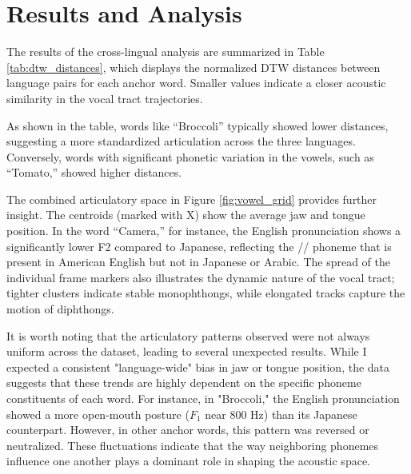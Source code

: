 \documentclass[11pt, letterpaper]{article}
\begin{document}

\section{Results and Analysis}
The results of the cross-lingual analysis are summarized in Table \ref{tab:dtw_distances}, which displays the normalized DTW distances between language pairs for each anchor word. Smaller values indicate a closer acoustic similarity in the vocal tract trajectories.

As shown in the table, words like ``Broccoli'' typically showed lower distances, suggesting a more standardized articulation across the three languages. 
Conversely, words with significant phonetic variation in the vowels, such as ``Tomato,'' showed higher distances.

The combined articulatory space in Figure \ref{fig:vowel_grid} provides further insight. 
The centroids (marked with X) show the average jaw and tongue position. 
In the word ``Camera,'' for instance, the English pronunciation shows a significantly lower F2 compared to Japanese, reflecting the /\textipa{\textturnr}/ phoneme that is present in American English but not in Japanese or Arabic.
The spread of the individual frame markers also illustrates the dynamic nature of the vocal tract; tighter clusters indicate stable monophthongs, while elongated tracks capture the motion of diphthongs.

It is worth noting that the articulatory patterns observed were not always uniform across the dataset, leading to several unexpected results. 
While I expected a consistent "language-wide" bias in jaw or tongue position, the data suggests that these trends are highly dependent on the specific phoneme constituents of each word. 
For instance, in "Broccoli," the English pronunciation showed a  more open-mouth posture ($F_1$ near 800 Hz) than its Japanese counterpart. 
However, in other anchor words, this pattern was reversed or neutralized. 
These fluctuations indicate that the way neighboring phonemes influence one another plays a dominant role in shaping the acoustic space.
\end{document}
